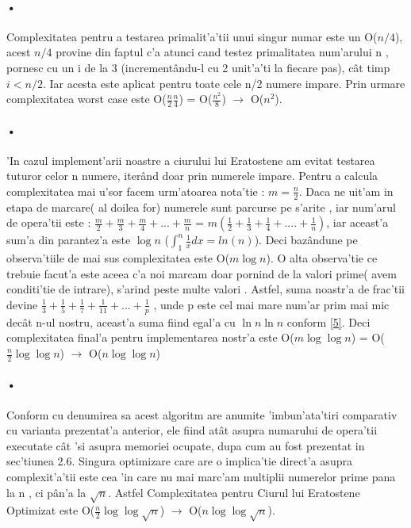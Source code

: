 \documentclass[12pt,twoside]{article}
\numberwithin{figure}{section}
\begin{document}
\paragraph{•}
Complexitatea pentru a testarea primalit'a'tii unui singur numar este un O($n/4$), acest $n/4$ provine din faptul c'a atunci cand testez primalitatea num'arului n , pornesc cu un i de la 3 (increment\^andu-l cu 2 unit'a'ti la fiecare pas), c\^at timp $i < n/2 $. Iar acesta este aplicat pentru toate cele n/2 numere impare. Prin urmare complexitatea worst case este O($\frac{n}{2} \frac{n}{4}$) = O($\frac{n^2}{8}$) $\to$
O($n^2$).

\begin{description}[font=$\bullet$~\normalfont\scshape\color{black!50!black}]
\item [Ciurul lui Eratostene]
\end{description}
\paragraph{•}
'In cazul implement'arii noastre a ciurului lui Eratostene am evitat testarea tuturor celor n numere, iter\^and doar prin numerele impare. Pentru a calcula complexitatea mai u'sor facem urm'atoarea nota'tie : $m  = \frac{n}{2}$. Daca ne uit'am in etapa de marcare( al doilea for) numerele sunt parcurse pe s'arite , iar num'arul de opera'tii este : $\frac{m}{2} + \frac{m}{3}  + \frac{m}{4} + ... + \frac{m}{n}$ = $m(\frac{1}{2} + \frac{1}{3} + \frac{1}{4} + .... + \frac{1}{n})$, iar aceast'a sum'a din parantez'a este $\log n$ ($\int_{1}^{n} \frac{1}{x} dx = ln(n)$). Deci baz\^andune pe observa'tiile de mai sus complexitatea este O($m \log n$). O alta observa'tie ce trebuie facut'a este aceea c'a noi marcam doar pornind de la valori prime( avem conditi'tie de intrare), s'arind peste multe valori . Astfel, suma noastr'a de frac'tii devine $\frac{1}{3} + \frac{1}{5} + \frac{1}{7} + \frac{1}{11} + ...+ \frac{1}{p}$ , unde p este cel mai mare num'ar prim mai mic dec\^at n-ul nostru, aceast'a suma fiind egal'a cu $\ln n \ln n$ conform \hyperlink{5}{[5]}. Deci complexitatea final'a pentru implementarea nostr'a este O($m \log \log n$) = O($\frac{n}{2} \log \log n$) $\to$ O($n \log \log n$) 

\begin{description}[font=$\bullet$~\normalfont\scshape\color{black!50!black}]
\item [Ciurul lui Eratostene Optimizat]
\end{description}
\paragraph{•}
Conform cu denumirea sa acest algoritm are anumite 'imbun'ata'tiri comparativ cu varianta prezentat'a anterior, ele fiind at\^at asupra numarului de opera'tii executate c\^at 'si asupra memoriei ocupate, dupa cum au fost prezentat in sec'tiunea 2.6. Singura optimizare care are o implica'tie direct'a asupra complexit'a'tii este cea 'in care nu mai marc'am multiplii numerelor prime pana la n , ci p\^an'a la $\sqrt{n}$. Astfel Complexitatea pentru Ciurul lui Eratostene Optimizat este O($\frac{n}{2} \log \log \sqrt{n}$) $\to$ O($n \log \log \sqrt{n}$).
\end{document}

